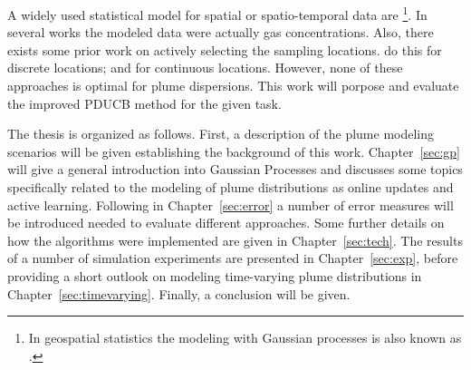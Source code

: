 A widely used statistical model for spatial or spatio-temporal data are 
\footnote{In geospatial statistics the modeling 
    with Gaussian processes is also known as .}. In several 
works \parencite[e.\,g.][]{Stachniss:2008vz, Marchant:2012wb} the modeled data 
were actually gas concentrations. Also, there exists some prior work on actively 
selecting the sampling locations. \Textcite{Stranders:2008wl} do this for 
discrete locations; \textcite{Singh:2010wt} and \textcite{Marchant:2012wb} for 
continuous locations. However, none of these approaches is optimal for plume 
dispersions. This work will porpose and evaluate the improved PDUCB method for 
the given task.

The thesis is organized as follows. First, a description of the plume modeling 
scenarios will be given establishing the background of this work.  
Chapter~\ref{sec:gp} will give a general introduction into Gaussian Processes 
and discusses some topics specifically related to the modeling of plume 
distributions as online updates and active learning. Following in 
Chapter~\ref{sec:error} a number of error measures will be introduced needed to 
evaluate different approaches. Some further details on how the algorithms were 
implemented are given in Chapter~\ref{sec:tech}. The results of a number of 
simulation experiments are presented in Chapter~\ref{sec:exp}, before providing 
a short outlook on modeling time-varying plume distributions in 
Chapter~\ref{sec:timevarying}. Finally, a conclusion will be given.
